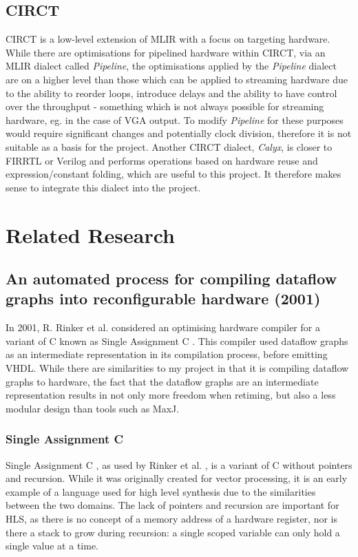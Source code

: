 \subsection{CIRCT}
CIRCT \cite{circt} is a low-level extension of MLIR \cite{mlir} with a focus on targeting hardware. While there are optimisations for pipelined hardware within CIRCT, via an MLIR dialect called \textit{Pipeline}, the optimisations applied by the \textit{Pipeline} dialect are on a higher level than those which can be applied to streaming hardware due to the ability to reorder loops, introduce delays and the ability to have control over the throughput - something which is not always possible for streaming hardware, eg. in the case of VGA output. To modify \textit{Pipeline} for these purposes would require significant changes and potentially clock division, therefore it is not suitable as a basis for the project. Another CIRCT dialect, \textit{Calyx}, is closer to FIRRTL or Verilog and performs operations based on hardware reuse and expression/constant folding, which are useful to this project. It therefore makes sense to integrate this dialect into the project.

\section{Related Research}
\subsection{An automated process for compiling dataflow graphs
into reconfigurable hardware (2001)}
In 2001, R. Rinker et al. \cite{920828} considered an optimising hardware compiler for a variant of C known as Single Assignment C \cite{sa-c}. This compiler used dataflow graphs as an intermediate representation in its compilation process, before emitting VHDL. While there are similarities to my project in that it is compiling dataflow graphs to hardware, the fact that the dataflow graphs are an intermediate representation results in not only more freedom when retiming, but also a less modular design than tools such as MaxJ.

\subsubsection{Single Assignment C}
Single Assignment C \cite{sa-c}, as used by Rinker et al. \cite{920828}, is a variant of C without pointers and recursion. While it was originally created for vector processing, it is an early example of a language used for high level synthesis due to the similarities between the two domains. The lack of pointers and recursion are important for HLS, as there is no concept of a memory address of a hardware register, nor is there a stack to grow during recursion: a single scoped variable can only hold a single value at a time.

